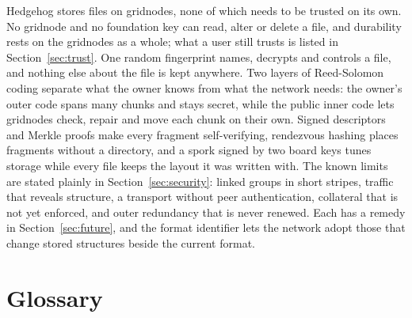\documentclass[10pt,a4paper,final]{article}
\begin{document}
Hedgehog stores files on gridnodes, none of which needs to be trusted on its own. No gridnode and no foundation key
can read, alter or delete a file, and durability rests on the gridnodes as a whole; what a user still trusts is
listed in Section~\ref{sec:trust}. One random fingerprint names, decrypts and controls a file, and nothing else about
the file is kept anywhere. Two layers of Reed-Solomon coding separate what the owner knows from what the network
needs: the owner's outer code spans many chunks and stays secret, while the public inner
code lets gridnodes check, repair and move each chunk on their own. Signed descriptors and Merkle proofs make every
fragment self-verifying, rendezvous hashing places fragments without a directory, and a spork signed by two board
keys tunes storage while every file keeps the layout it was written with. The known limits are stated plainly in
Section~\ref{sec:security}: linked groups in short stripes, traffic that reveals structure, a transport without peer
authentication, collateral that is not yet enforced, and outer redundancy that is never renewed. Each has a remedy
in Section~\ref{sec:future}, and the format identifier lets the network adopt those that change stored structures
beside the current format.

\appendix

\section{Glossary}
\end{document}
